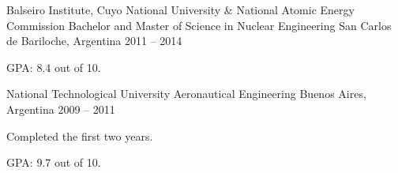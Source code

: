 
\begin{cventries}

  \cventry
    {Balseiro Institute, Cuyo National University \& National Atomic Energy Commission}
    {Bachelor and Master of Science in Nuclear Engineering}
    {San Carlos de Bariloche, Argentina}
    {2011 -- 2014}
    {
      \begin{cvitems}
        \item{GPA: 8.4 out of 10.}
      \end{cvitems}
      \vspace{1em}
    }

  \cventry
    {National Technological University}
    {Aeronautical Engineering}
    {Buenos Aires, Argentina}
    {2009 -- 2011}
    {
      \begin{cvitems}
        \item{Completed the first two years.}
        \item{GPA: 9.7 out of 10.}
      \end{cvitems}
    }

\end{cventries}

